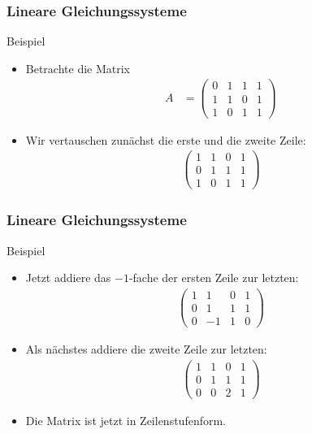 \documentclass{beamer}
\renewcommand{\ae}{\"a}
\newcommand{\mytitle}{Lineare Gleichungssysteme}
\begin{document}
\begin{frame}\frametitle{\mytitle}
	\begin{block}{Beispiel}
	\begin{itemize}
		\item Betrachte die Matrix
			\begin{align*}
				A&=\begin{pmatrix}
					0&1&1&1\\1&1&0&1\\1&0&1&1
				\end{pmatrix}
			\end{align*}
		\item Wir vertauschen zun\ae chst die erste und die zweite Zeile:
			\begin{align*}
			\begin{pmatrix}
					1&1&0&1\\0&1&1&1\\1&0&1&1
				\end{pmatrix}
			\end{align*}
	\end{itemize}
	\end{block}
\end{frame}

\begin{frame}\frametitle{\mytitle}
	\begin{block}{Beispiel}
	\begin{itemize}
		\item Jetzt addiere das $-1$-fache der ersten Zeile zur letzten:
			\begin{align*}
			\begin{pmatrix}
					1&1&0&1\\0&1&1&1\\0&-1&1&0
				\end{pmatrix}
			\end{align*}
		\item Als n\ae chstes addiere die zweite Zeile zur letzten:
			\begin{align*}
			\begin{pmatrix}
					1&1&0&1\\0&1&1&1\\0&0&2&1
				\end{pmatrix}
			\end{align*}
		\item Die Matrix ist jetzt in Zeilenstufenform.
	\end{itemize}
	\end{block}
\end{frame}
\end{document}
